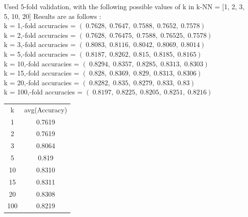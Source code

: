 \documentclass[a4paper,11pt]{article}
\begin{document}
\begin{mlsolution}
Used 5-fold validation, with the following possible values of k in k-NN = [1, 2, 3, 5, 10, 20]
Results are as follows : 
\\ k = 1,-fold accuracies = \begin{math} \left ( \; 0.7628,\; 0.7647,\; 0.7588,\; 0.7652,\; 0.7578 \right ) \end{math}
\\ k = 2,-fold accuracies = \begin{math} \left ( \; 0.7628,\; 0.76475,\; 0.7588,\; 0.76525,\; 0.7578 \right ) \end{math}
\\ k = 3,-fold accuracies = \begin{math} \left ( \; 0.8083,\; 0.8116,\; 0.8042,\; 0.8069,\; 0.8014 \right ) \end{math}
\\ k = 5,-fold accuracies = \begin{math} \left ( \; 0.8187,\; 0.8262,\; 0.815,\; 0.8185,\; 0.8165 \right ) \end{math}
\\ k = 10,-fold accuracies = \begin{math} \left ( \; 0.8294,\; 0.8357,\; 0.8285,\; 0.8313,\; 0.8303 \right ) \end{math}
\\ k = 15,-fold accuracies = \begin{math} \left ( \; 0.828,\; 0.8369,\; 0.829,\; 0.8313,\; 0.8306 \right ) \end{math}
\\ k = 20,-fold accuracies = \begin{math} \left ( \; 0.8282,\; 0.835,\; 0.8279,\; 0.833,\; 0.83 \right ) \end{math}
\\ k = 100,-fold accuracies = \begin{math} \left ( \; 0.8197,\; 0.8225,\; 0.8205,\; 0.8251,\; 0.8216 \right ) \end{math}

\begin{center}
 \begin{tabular}{|c|c|} 
 \hline
 k & avg(Accuracy) \\ [0.5ex] 
 1 & 0.7619   \\
 2 & 0.7619 \\ 
 3 & 0.8064   \\
 5 & 0.819   \\
 10 & 0.8310   \\
 15 & 0.8311  \\
 20 & 0.8308   \\
 100 & 0.8219   \\[1ex] 
 \hline
\end{tabular}
\end{center}


\end{mlsolution}
\end{document}
